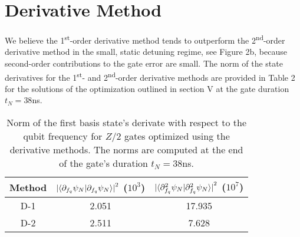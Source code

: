 \section{Derivative Method}
We believe the 1\textsuperscript{st}-order derivative method tends
to outperform the 2\textsuperscript{nd}-order
derivative method in the small, static detuning regime, see Figure 2b,
because second-order contributions to the gate error are small.
The norm of the state derivatives for the 1\textsuperscript{st}- and 2\textsuperscript{nd}-order
derivative methods are provided in Table 2 for the solutions of the optimization outlined
in section V at the gate duration $t_{N} = 38$ns.

\begin{table}[h]
  \begin{tabular}{c | c | c}
    Method & ${\lvert \braket{\partial_{f_{q}} \psi_{N} | \partial_{f_{q}} \psi_{N}} \rvert}^{2}$ ($10^{3}$)
    & ${\lvert \braket{\partial^{2}_{f_{q}} \psi_{N} | \partial^{2}_{f_{q}} \psi_{N}} \rvert}^{2}$ ($10^{7}$)\\
    \hline
    D-1 & 2.051 & 17.935\\
    D-2 & 2.511 & 7.628\\
  \end{tabular}
  \caption{Norm of the first basis state's derivate with respect to the qubit frequency
    for $Z/2$ gates optimized using the derivative methods. The norms are computed
    at the end of the gate's duration $t_{N} = 38$ns.}
\end{table}

